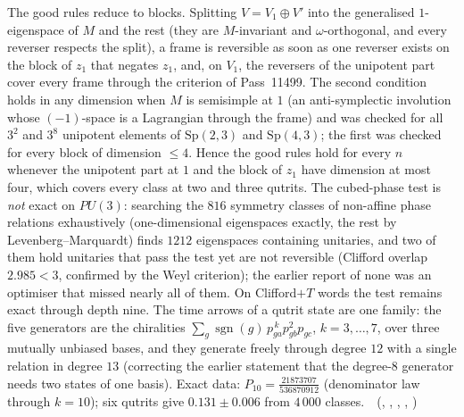 The good rules reduce to blocks. Splitting $V=V_1\oplus V'$ into the generalised $1$-eigenspace of $M$ and the rest (they are
$M$-invariant and $\omega$-orthogonal, and every reverser respects the split), a frame is reversible as soon as one reverser exists
on the block of $z_1$ that negates $z_1$, and, on $V_1$, the reversers of the unipotent part cover every frame through the
criterion of Pass~11499. The second condition holds in any dimension when $M$ is semisimple at $1$ (an anti-symplectic involution
whose $(-1)$-space is a Lagrangian through the frame) and was checked for all $3^2$ and $3^8$ unipotent elements of
$\mathrm{Sp}(2,3)$ and $\mathrm{Sp}(4,3)$; the first was checked for every block of dimension $\le4$. Hence the good rules hold for
every $n$ whenever the unipotent part at $1$ and the block of $z_1$ have dimension at most four, which covers every class at two and
three qutrits. The cubed-phase test is \emph{not} exact on $PU(3)$: searching the $816$ symmetry classes of non-affine phase relations
exhaustively (one-dimensional eigenspaces exactly, the rest by Levenberg--Marquardt) finds $1212$ eigenspaces containing
unitaries, and two of them hold unitaries that pass the test yet are not reversible (Clifford overlap $2.985<3$, confirmed by the
Weyl criterion); the earlier report of none was an optimiser that missed nearly all of them. On Clifford$+T$ words the test
remains exact through depth nine. The time arrows of a qutrit state are one family: the five
generators are the chiralities $\sum_g\operatorname{sgn}(g)\,p_{ga}^{\,k}p_{gb}^2p_{gc}$, $k=3,\dots,7$, over three mutually unbiased
bases, and they generate freely through degree $12$ with a single relation in degree $13$ (correcting the earlier statement that
the degree-$8$ generator needs two states of one basis). Exact data: $P_{10}=\tfrac{21873707}{536870912}$ (denominator law through $k=10$); six
qutrits give $0.131\pm 0.006$ from $4\,000$ classes.
\tierT\,\tierC\ (, ,
, ,
)

